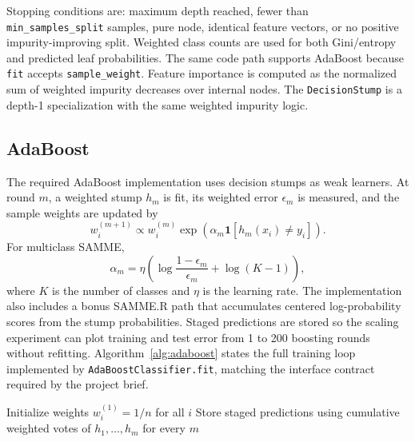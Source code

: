 \documentclass[conference]{IEEEtran}
\begin{document}
Stopping conditions are: maximum depth reached, fewer than
\texttt{min\_samples\_split} samples, pure node, identical feature vectors, or
no positive impurity-improving split. Weighted class counts are used for both
Gini/entropy and predicted leaf probabilities. The same code path supports
AdaBoost because \texttt{fit} accepts \texttt{sample\_weight}. Feature
importance is computed as the normalized sum of weighted impurity decreases
over internal nodes. The \texttt{DecisionStump} is a depth-1 specialization
with the same weighted impurity logic.

\subsection{AdaBoost}
The required AdaBoost implementation uses decision stumps as weak learners.
At round $m$, a weighted stump $h_m$ is fit, its weighted error
$\epsilon_m$ is measured, and the sample weights are updated by
\[
w_i^{(m+1)} \propto w_i^{(m)}
\exp(\alpha_m \mathbf{1}[h_m(x_i)\ne y_i]).
\]
For multiclass SAMME,
\[
\alpha_m=\eta\left(\log\frac{1-\epsilon_m}{\epsilon_m}+
\log(K-1)\right),
\]
where $K$ is the number of classes and $\eta$ is the learning rate. The
implementation also includes a bonus SAMME.R path that accumulates centered
log-probability scores from the stump probabilities. Staged predictions are
stored so the scaling experiment can plot training and test error from 1 to
200 boosting rounds without refitting. Algorithm~\ref{alg:adaboost} states the
full training loop implemented by \texttt{AdaBoostClassifier.fit}, matching
the interface contract required by the project brief.

\begin{algorithm}[t]
\SetAlgoLined
{}
Initialize weights $w_i^{(1)} = 1/n$ for all $i$\;
Store staged predictions using cumulative weighted votes of $h_1,\dots,h_m$ for every $m$\;
\caption{SAMME AdaBoost training, as implemented by \texttt{AdaBoostClassifier.fit}.}
\label{alg:adaboost}
\end{algorithm}
\end{document}
